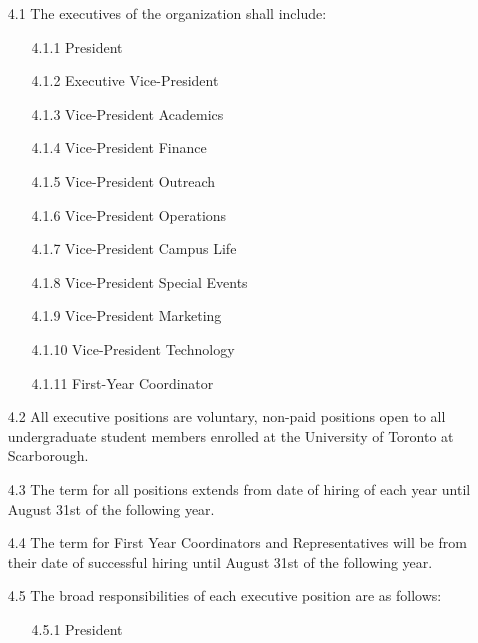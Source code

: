 \documentclass[12pt,a4paper]{article}
\begin{document}
\begin{enumerate}
\item[4.1] The executives of the organization shall include:

\begin{enumerate}
\item[4.1.1] President

\item[4.1.2] Executive Vice-President

\item[4.1.3] Vice-President Academics

\item[4.1.4] Vice-President Finance

\item[4.1.5] Vice-President Outreach

\item[4.1.6] Vice-President Operations

\item[4.1.7] Vice-President Campus Life

\item[4.1.8] Vice-President Special Events

\item[4.1.9] Vice-President Marketing

\item[4.1.10] Vice-President Technology

\item[4.1.11] First-Year Coordinator
\end{enumerate}

\item[4.2] All executive positions are voluntary, non-paid positions open to all undergraduate student members enrolled at the University of Toronto at Scarborough.

\item[4.3] The term for all positions extends from date of hiring of each year until August 31st of the following year.

\item[4.4] The term for First Year Coordinators and Representatives will be from their date of successful hiring until August 31st of the following year.

\item[4.5] The broad responsibilities of each executive position are as follows:

\begin{enumerate}
\item[4.5.1] President


\end{enumerate}
\end{enumerate}
\end{document}
